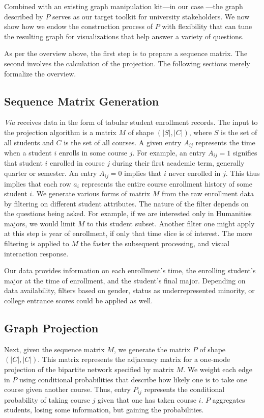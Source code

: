 \documentclass{sigchi}
\begin{document}
Combined with an existing graph manipulation kit---in our case
\cite{shannon2003cytoscape}---the graph described by $P$ serves as our
target toolkit for university stakeholders. We now show how we endow
the construction process of $P$ with flexibility that can tune the
resulting graph for visualizations that help answer a variety of
questions.

As per the overview above, the first step is to prepare a sequence
matrix. The second involves the calculation of the projection. The
following sections merely formalize the overview.

\subsection{Sequence Matrix Generation}
\label{sec:seq_martix}

{\em Via} receives data in the form of tabular student enrollment
records. The input to the projection algorithm is a matrix $M$ of
shape $(|S|, |C|)$, where $S$ is the set of all students and $C$ is
the set of all courses. A given entry $A_{ij}$ represents the time
when a student $i$ enrolls in some course $j$. For example, an entry
$A_{ij} = 1$ signifies that student $i$ enrolled in course $j$ during
their first academic term, generally quarter or semester. An entry
$A_{ij} = 0$ implies that $i$ never enrolled in $j$. This thus implies
that each row $a_i$ represents the entire course enrollment history of
some student $i$. We generate various forms of matrix $M$ from the raw
enrollment data by filtering on different student attributes. The
nature of the filter depends on the questions being asked. For
example, if we are interested only in Humanities majors, we would
limit $M$ to this student subset. Another filter one might apply at
this step is year of enrollment, if only that time slice is of
interest. The more filtering is applied to $M$ the faster the
subsequent processing, and visual interaction response.

Our data provides information on each enrollment's time, the enrolling
student's major at the time of enrollment, and the student's final
major. Depending on data availability, filters based on gender, status
as underrepresented minority, or college entrance scores could be
applied as well.

\subsection{Graph Projection}
\label{sec:graph_projection}
Next, given the sequence matrix $M$, we generate the matrix $P$ of
shape $(|C|, |C|)$. This matrix represents the adjacency matrix for a
one-mode projection of the bipartite network specified by matrix
$M$. We weight each edge in $P$ using conditional probabilities that
describe how likely one is to take one course given another
course. Thus, entry $P_{ij}$ represents the conditional probability of
taking course $j$ given that one has taken course $i$. $P$ aggregates
students, losing some information, but gaining the probabilities.
\end{document}
